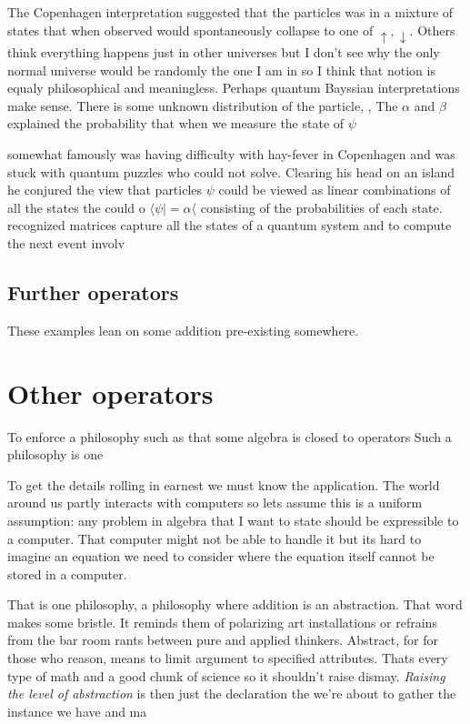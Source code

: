 The Copenhagen interpretation suggested that the particles 
was in a mixture of states that when observed would spontaneously collapse 
to one of $\uparrow,\downarrow$.  Others think everything happens just in 
other universes but I don't see why the only normal universe would be 
randomly the one I am in so I think that notion is equaly philosophical and 
meaningless.  Perhaps quantum Bayssian interpretations make sense.  There is 
some unknown distribution of the particle, , 
The $\alpha$ and $\beta$ explained the probability that when we 
measure the state of $\psi$ 

somewhat famously 
was having difficulty with hay-fever in Copenhagen and was stuck with 
quantum puzzles who could not solve. Clearing his head on an island 
he conjured the view that particles $\psi$ could be viewed as linear 
combinations of all the states the could o
$\langle \psi|=\alpha \langle $ consisting of the probabilities of each state.
recognized matrices capture all the states of a quantum system and 
to compute the next event involv



\subsection{Further operators}




These examples lean on some addition pre-existing somewhere.  





\section*{Other operators}



To enforce a philosophy such as that some algebra is closed to 
operators 
Such a philosophy is one 


To get the details rolling in earnest we must know the application.
The world around us partly interacts with computers so lets assume 
this is a uniform assumption: any problem in algebra that I want to 
state should be expressible to a computer.  That computer might not 
be able to handle it but its hard to imagine an equation we need 
to consider where the equation itself cannot be stored in a computer.




That is one philosophy, a philosophy where addition is an abstraction.
That word makes some bristle.  It reminds them of polarizing art 
installations or refrains from the bar room rants between pure and 
applied thinkers.  Abstract, for for those who reason, means to limit 
argument to specified attributes.  Thats every type of math and a good 
chunk of science so it shouldn't raise dismay.  \emph{Raising the level of 
abstraction} is then just the declaration the we're about to gather the 
instance we have and ma

